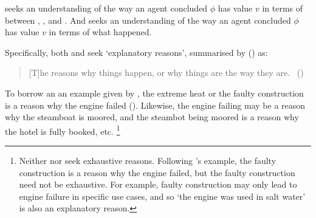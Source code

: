\begin{note}
  \qWhy{} seeks an understanding of the way an agent concluded \(\phi\) has value \(v\) in terms of \ros{} between , , and .
  And \qHow{} seeks an understanding of the way an agent concluded \(\phi\) has value \(v\) in terms of what happened.

  Specifically, both \qWhy{} and \qHow{} seek `explanatory reasons', summarised by \citeauthor{Hieronymi:2011aa} (\citeyear{Hieronymi:2011aa}) as:
  \begin{quote}
    [T]he reasons why things happen, or why things are the way they are.\newline
    \mbox{ }\hfill\mbox{(\citeyear[410]{Hieronymi:2011aa})}
  \end{quote}
  To borrow an an example given by \citeauthor{Hieronymi:2011aa}, the extreme heat or the faulty construction is a reason why the engine failed (\citeyear[409]{Hieronymi:2011aa}).
  Likewise, the engine failing may be a reason why the steamboat is moored, and the steambot being moored is a reason why the hotel is fully booked, etc.%
  \footnote{
    Neither \qWhy{} nor \qHow{} seek exhaustive reasons.
    Following \citeauthor{Hieronymi:2011aa}'s example, the faulty construction is a reason why the engine failed, but the faulty construction need not be exhaustive.
    For example, faulty construction may only lead to engine failure in specific use cases, and so `the engine was used in salt water' is also an explanatory reason.
  }
\end{note}

